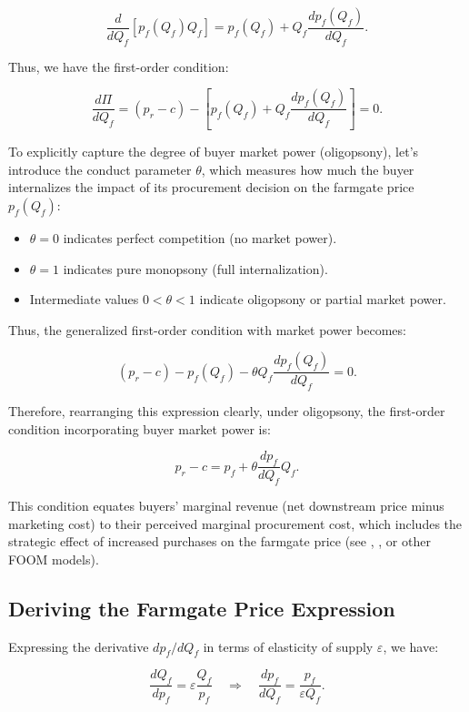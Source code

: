 \[
\frac{d}{dQ_f}\left[p_f(Q_f)Q_f\right] = p_f(Q_f) + Q_f \frac{dp_f(Q_f)}{dQ_f}.
\]

Thus, we have the first-order condition:

\[
\frac{d\Pi}{dQ_f} = (p_r - c) - \left[p_f(Q_f) + Q_f \frac{dp_f(Q_f)}{dQ_f}\right] = 0.
\]



To explicitly capture the degree of buyer market power (oligopsony), let's introduce the conduct parameter \(\theta\), which measures how much the buyer internalizes the impact of its procurement decision on the farmgate price \(p_f(Q_f)\):
\begin{itemize}
    \item \(\theta = 0\) indicates perfect competition (no market power).
    \item \(\theta = 1\) indicates pure monopsony (full internalization).
    \item Intermediate values \(0 < \theta < 1\) indicate oligopsony or partial market power.
\end{itemize}

Thus, the generalized first-order condition with market power becomes:

\[
(p_r - c) - p_f(Q_f) - \theta Q_f \frac{dp_f(Q_f)}{dQ_f} = 0.
\]

Therefore, rearranging this expression clearly, under oligopsony, the first-order condition incorporating buyer market power is:

\begin{equation}
p_r - c = p_f + \theta \frac{dp_f}{dQ_f}Q_f.
\end{equation}

This condition equates buyers' marginal revenue (net downstream price minus marketing cost) to their perceived marginal procurement cost, which includes the strategic effect of increased purchases on the farmgate price (see \cite{sexton2000industrialization}, \cite{rogers_rich_1994assessing}, or other FOOM models).

\subsection{Deriving the Farmgate Price Expression}

Expressing the derivative \( dp_f/dQ_f \) in terms of elasticity of supply \( \varepsilon \), we have:

\begin{equation}
\frac{dQ_f}{dp_f} = \varepsilon \frac{Q_f}{p_f} \quad \Rightarrow \quad \frac{dp_f}{dQ_f} = \frac{p_f}{\varepsilon Q_f}.
\end{equation}

